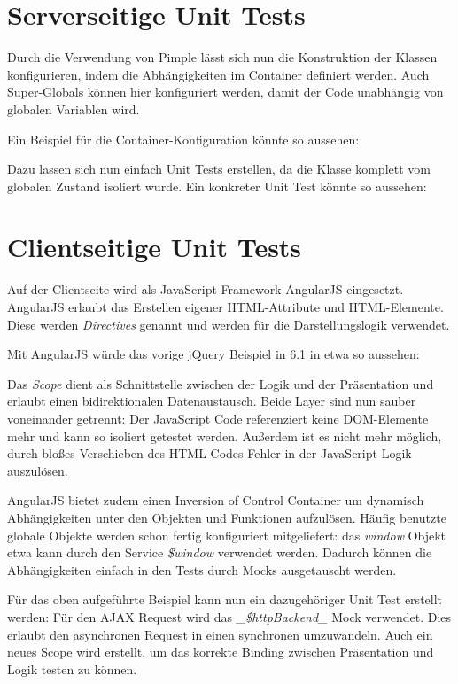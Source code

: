 \documentclass[a4paper,bibtotoc,oneside]{scrbook}
\begin{document}
\section{Serverseitige Unit Tests}
Durch die Verwendung von Pimple lässt sich nun die Konstruktion der Klassen konfigurieren, indem die Abhängigkeiten im Container definiert werden. Auch Super-Globals können hier konfiguriert werden, damit der Code unabhängig von globalen Variablen wird. 

Ein Beispiel für die Container-Konfiguration könnte so aussehen:


Dazu lassen sich nun einfach Unit Tests erstellen, da die Klasse komplett vom globalen Zustand isoliert wurde. Ein konkreter Unit Test könnte so aussehen:





\section{Clientseitige Unit Tests}
Auf der Clientseite wird als JavaScript Framework AngularJS eingesetzt. AngularJS erlaubt das Erstellen eigener HTML-Attribute und HTML-Elemente. Diese werden \emph{Directives} genannt und werden für die Darstellungslogik verwendet.

Mit AngularJS würde das vorige jQuery Beispiel in 6.1 in etwa so aussehen:




Das \emph{Scope} dient als Schnittstelle zwischen der Logik und der Präsentation und erlaubt einen bidirektionalen Datenaustausch. Beide Layer sind nun sauber voneinander getrennt: Der JavaScript Code referenziert keine DOM-Elemente mehr und kann so isoliert getestet werden. Außerdem ist es nicht mehr möglich, durch bloßes Verschieben des HTML-Codes Fehler in der JavaScript Logik auszulösen.

AngularJS bietet zudem einen Inversion of Control Container um dynamisch Abhängigkeiten unter den Objekten und Funktionen aufzulösen. Häufig benutzte globale Objekte werden schon fertig konfiguriert mitgeliefert: das \emph{window} Objekt etwa kann durch den Service \emph{\$window} verwendet werden. Dadurch können die Abhängigkeiten einfach in den Tests durch Mocks ausgetauscht werden.

Für das oben aufgeführte Beispiel kann nun ein dazugehöriger Unit Test erstellt werden: Für den AJAX Request wird das \emph{\_\$httpBackend\_} Mock verwendet. Dies erlaubt den asynchronen Request in einen synchronen umzuwandeln. Auch ein neues Scope wird erstellt, um das korrekte Binding zwischen Präsentation und Logik testen zu können.
\end{document}
